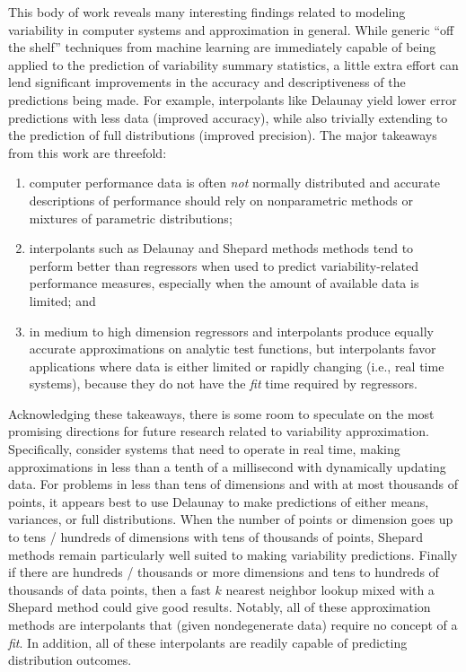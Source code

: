 
This body of work reveals many interesting findings related to modeling variability in computer systems and approximation in general. While generic ``off the shelf'' techniques from machine learning are immediately capable of being applied to the prediction of variability summary statistics, a little extra effort can lend significant improvements in the accuracy and descriptiveness of the predictions being made. For example, interpolants like Delaunay yield lower error predictions with less data (improved accuracy), while also trivially extending to the prediction of full distributions (improved precision). The major takeaways from this work are threefold:

\begin{enumerate}
\item computer performance data is often \textit{not} normally distributed and accurate descriptions of performance should rely on nonparametric methods or mixtures of parametric distributions;
\item interpolants such as Delaunay and Shepard methods methods tend to perform better than regressors when used to predict variability-related performance measures, especially when the amount of available data is limited; and
\item in medium to high dimension regressors and interpolants produce equally accurate approximations on analytic test functions, but interpolants favor applications where data is either limited or rapidly changing (i.e., real time systems), because they do not have the \textit{fit} time required by regressors.
\end{enumerate}

Acknowledging these takeaways, there is some room to speculate on the most promising directions for future research related to variability approximation. Specifically, consider systems that need to operate in real time, making approximations in less than a tenth of a millisecond with dynamically updating data. For problems in less than tens of dimensions and with at most thousands of points, it appears best to use Delaunay to make predictions of either means, variances, or full distributions. When the number of points or dimension goes up to tens / hundreds of dimensions with tens of thousands of points, Shepard methods remain particularly well suited to making variability predictions. Finally if there are hundreds / thousands or more dimensions and tens to hundreds of thousands of data points, then a fast $k$ nearest neighbor lookup mixed with a Shepard method could give good results. Notably, all of these approximation methods are interpolants that (given nondegenerate data) require no concept of a \textit{fit}. In addition, all of these interpolants are readily capable of predicting distribution outcomes.

